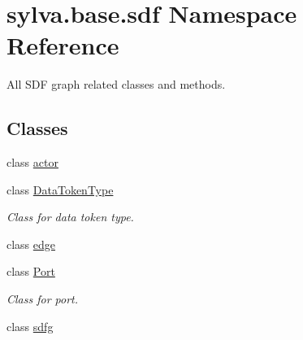 \hypertarget{namespacesylva_1_1base_1_1sdf}{}\section{sylva.\+base.\+sdf Namespace Reference}
\label{namespacesylva_1_1base_1_1sdf}


All S\+DF graph related classes and methods.  


\subsection*{Classes}
\begin{DoxyCompactItemize}
\item 
class \hyperlink{classsylva_1_1base_1_1sdf_1_1actor}{actor}
\item 
class \hyperlink{classsylva_1_1base_1_1sdf_1_1_data_token_type}{Data\+Token\+Type}
\begin{DoxyCompactList}\small\item\em Class for data token type. \end{DoxyCompactList}\item 
class \hyperlink{classsylva_1_1base_1_1sdf_1_1edge}{edge}
\item 
class \hyperlink{classsylva_1_1base_1_1sdf_1_1_port}{Port}
\begin{DoxyCompactList}\small\item\em Class for port. \end{DoxyCompactList}\item 
class \hyperlink{classsylva_1_1base_1_1sdf_1_1sdfg}{sdfg}
\end{DoxyCompactItemize}
